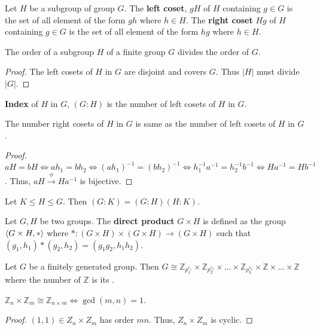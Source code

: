 \begin{definition}
	Let $H$ be a subgroup of group $G$.
	The \textbf{left coset}, $gH$ of $H$ containing $g \in G$ is the set of all element of the form $gh$ where $h \in H$.
	The \textbf{right coset} $Hg$ of $H$ containing $g \in G$ is the set of all element of the form $hg$ where $h \in H$.
\end{definition}

\begin{theorem}[Lagrange]
	The order of a subgroup $H$ of a finite group $G$  divides the order of $G$.
\end{theorem}
\begin{proof}
	The left cosets of $H$ in $G$ are disjoint and covers $G$. Thus $|H|$ must divide $|G|$.
\end{proof}

\begin{definition}
	\textbf{Index} of $H$ in $G$, $(G:H)$ is the number of left cosets of $H$ in $G$.
\end{definition}
\begin{theorem}
	The number right cosets of $H$ in $G$ is same as the number of left cosets of $H$ in $G$.
\end{theorem}
\begin{proof}
	$aH = bH \iff ah_1 = bh_2 \iff (ah_1)^{-1} = (bh_2)^{-1} \iff h_1^{-1}a^{-1} = h_2^{-1}b^{-1} \iff Ha^{-1} = Hb^{-1}$.
	Thus, $aH \overset{\phi}{\to} Ha^{-1}$ is bijective.
\end{proof}

\begin{theorem}
	Let $K \le H \le G$.
	Then $(G:K) = (G:H)(H:K)$.
\end{theorem}

\begin{definition}
	Let $G,H$ be two groups.
	The \textbf{direct product} $G \times H$ is defined as the group $\left\langle G \times H,\ast \right\rangle$ where $\ast : (G \times H) \times (G \times H) \to (G \times H)$ such that $(g_1,h_1) \ast (g_2,h_2) = (g_1g_2,h_1h_2)$.
\end{definition}

\begin{theorem}
	Let $G$ be a finitely generated group.
	Then $G \cong \mathbb{Z}_{p_1^{r_1}} \times \mathbb{Z}_{p_2^{r_2}} \times \dots \times \mathbb{Z}_{p_k^{r_k}} \times \mathbb{Z} \times \dots \times \mathbb{Z}$ where the number of $\mathbb{Z}$ is its .
\end{theorem}

\begin{theorem}
	$\mathbb{Z}_n \times \mathbb{Z}_m \cong \mathbb{Z}_{n \times m} \iff \gcd(m,n)=1$.
\end{theorem}
\begin{proof}
	$(1,1) \in Z_n \times Z_m$ has order $mn$.
	Thus, $Z_n \times Z_m$ is cyclic.
\end{proof}

